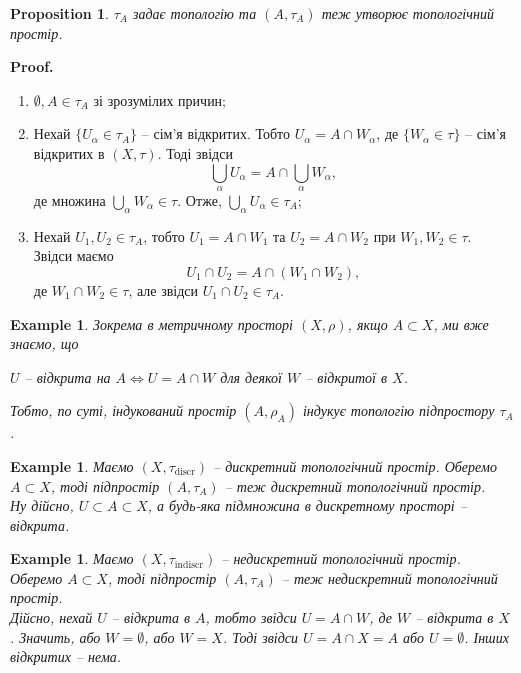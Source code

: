 \documentclass[a4paper, 10pt]{article}
\makeatletter
\theoremstyle{theoremdd}
\newtheorem{example}[theorem]{Example}
\newtheorem{proposition}[theorem]{Proposition}
\renewenvironment{proof}[1][Proof.\\]{\par
\pushQED{\hfill \qed}%
\normalfont \topsep6\p@\@plus6\p@\relax
\trivlist
\item\relax
{\bfseries
#1\@addpunct{.}}\hspace\labelsep\ignorespaces
}{%
\popQED\endtrivlist\@endpefalse
}
\newcommand\nospacebeforeitem{
\vspace{-\topsep}
\vspace{-\topsep}
\vspace{-\topsep}
}
\makeatother
\begin{document}
\begin{proposition}
$\tau_A$ задає топологію та $(A,\tau_A)$ теж утворює топологічний простір.
\end{proposition}

\begin{proof}
\nospacebeforeitem
\begin{enumerate}[wide=0pt,label={\arabic*)}]
\item $\emptyset,A \in \tau_A$ зі зрозумілих причин;
\item Нехай $\{U_\alpha \in \tau_A\}$ -- сім'я відкритих. Тобто $U_\alpha = A \cap W_\alpha$, де $\{W_\alpha \in \tau\}$ -- сім'я відкритих в $(X,\tau)$. Тоді звідси 
\[
\displaystyle\bigcup_\alpha U_\alpha = A \cap \bigcup_\alpha W_\alpha,
\]
де множина $\displaystyle\bigcup_\alpha W_\alpha \in \tau$. Отже, $\displaystyle\bigcup_\alpha U_\alpha \in \tau_A$;
\item Нехай $U_1, U_2 \in \tau_A$, тобто $U_1 = A \cap W_1$ та $U_2 = A \cap W_2$ при $W_1,W_2 \in \tau$. Звідси маємо \[
U_1 \cap U_2 = A \cap (W_1 \cap W_2),
\] де $W_1 \cap W_2 \in \tau$, але звідси $U_1 \cap U_2 \in \tau_A$. \qedhere
\end{enumerate}
\end{proof}

\begin{example}
Зокрема в метричному просторі $(X,\rho)$, якщо $A \subset X$, ми вже знаємо, що
\begin{center}
$U$ -- відкрита на $A \iff U = A \cap W$ для деякої $W$ -- відкритої в $X$.
\end{center}
Тобто, по суті, індукований простір $(A,\rho_A)$ індукує топологію підпростору $\tau_A$.
\end{example}

\begin{example}
Маємо $(X,\tau_{\text{discr}})$ -- дискретний топологічний простір. Оберемо $A \subset X$, тоді підпростір $(A,\tau_{A})$ -- теж дискретний топологічний простір.\\
Ну дійсно, $U \subset A \subset X$, а будь-яка підмножина в дискретному просторі -- відкрита.
\end{example}

\begin{example}
\label{subspace_of_indiscrete_space_is_also_indiscrete}
Маємо $(X,\tau_{\text{indiscr}})$ -- недискретний топологічний простір. Оберемо $A \subset X$, тоді підпростір $(A,\tau_{A})$ -- теж недискретний топологічний простір.\\
Дійсно, нехай $U$ -- відкрита в $A$, тобто звідси $U = A \cap W$, де $W$ -- відкрита в $X$. Значить, або $W = \emptyset$, або $W = X$. Тоді звідси $U = A \cap X = A$ або $U = \emptyset$. Інших відкритих -- нема.
\end{example}
\end{document}
